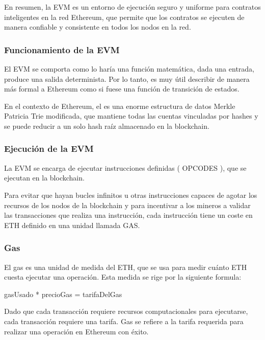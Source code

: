 \bigskip

En resumen, la EVM es un entorno de ejecución seguro y uniforme para contratos inteligentes en la red Ethereum, que permite que los contratos se ejecuten de manera confiable y consistente en todos los nodos en la red.

\subsubsection{Funcionamiento de la EVM}

El EVM se comporta como lo haría una función matemática, dada una entrada, produce una salida determinista. Por lo tanto, es muy útil describir de manera más formal a Ethereum como si fuese una función de transición de estados.

\bigskip

En el contexto de Ethereum, el  es una enorme estructura de datos Merkle Patricia Trie modificada\cite{patricia}, que mantiene todas las cuentas vinculadas por hashes y se puede reducir a un solo hash raíz almacenado en la blockchain.

\subsubsection{Ejecución de la EVM}

La EVM se encarga de ejecutar instrucciones definidas ( OPCODES )\cite{opcodes}, que se ejecutan en la blockchain.

\bigskip


Para evitar que hayan bucles infinitos u otras instrucciones capaces de agotar los recursos de los nodos de la blockchain y para incentivar a los mineros a validar las transacciones que realiza una instrucción, cada instrucción tiene un coste en ETH definido en una unidad llamada GAS.

\subsubsection{Gas}

El gas es una unidad de medida del ETH, que se usa para medir cuánto ETH cuesta ejecutar una operación.\cite{gas} Esta medida se rige por la siguiente formula:

\bigskip

\centerline{gasUsado * precioGas = tarifaDelGas}

\bigskip

Dado que cada transacción requiere recursos computacionales para ejecutarse, cada transacción requiere una tarifa. Gas se refiere a la tarifa requerida para realizar una operación en Ethereum con éxito.

